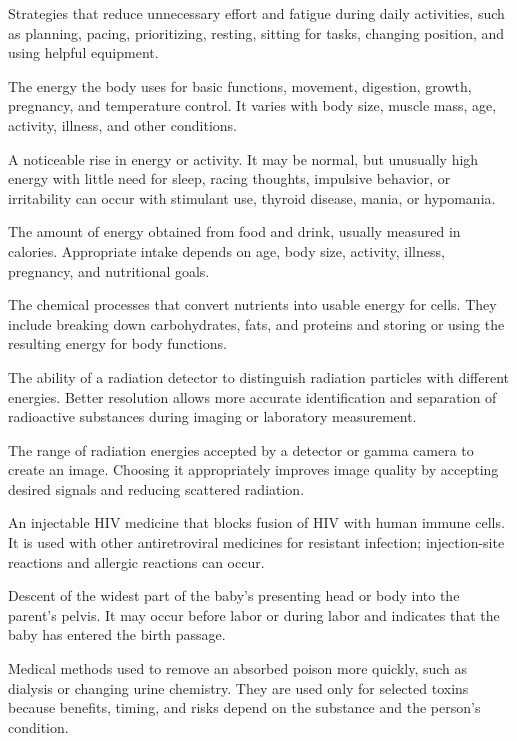 Strategies that reduce unnecessary effort and fatigue during daily activities, such as planning, pacing, prioritizing, resting, sitting for tasks, changing position, and using helpful equipment.

 The energy the body uses for basic functions, movement, digestion, growth, pregnancy, and temperature control. It varies with body size, muscle mass, age, activity, illness, and other conditions.

 A noticeable rise in energy or activity. It may be normal, but unusually high energy with little need for sleep, racing thoughts, impulsive behavior, or irritability can occur with stimulant use, thyroid disease, mania, or hypomania.

 The amount of energy obtained from food and drink, usually measured in calories. Appropriate intake depends on age, body size, activity, illness, pregnancy, and nutritional goals.

 The chemical processes that convert nutrients into usable energy for cells. They include breaking down carbohydrates, fats, and proteins and storing or using the resulting energy for body functions.

 The ability of a radiation detector to distinguish radiation particles with different energies. Better resolution allows more accurate identification and separation of radioactive substances during imaging or laboratory measurement.

 The range of radiation energies accepted by a detector or gamma camera to create an image. Choosing it appropriately improves image quality by accepting desired signals and reducing scattered radiation.

 An injectable HIV medicine that blocks fusion of HIV with human immune cells. It is used with other antiretroviral medicines for resistant infection; injection-site reactions and allergic reactions can occur.

 Descent of the widest part of the baby’s presenting head or body into the parent’s pelvis. It may occur before labor or during labor and indicates that the baby has entered the birth passage.

 Medical methods used to remove an absorbed poison more quickly, such as dialysis or changing urine chemistry. They are used only for selected toxins because benefits, timing, and risks depend on the substance and the person’s condition.

